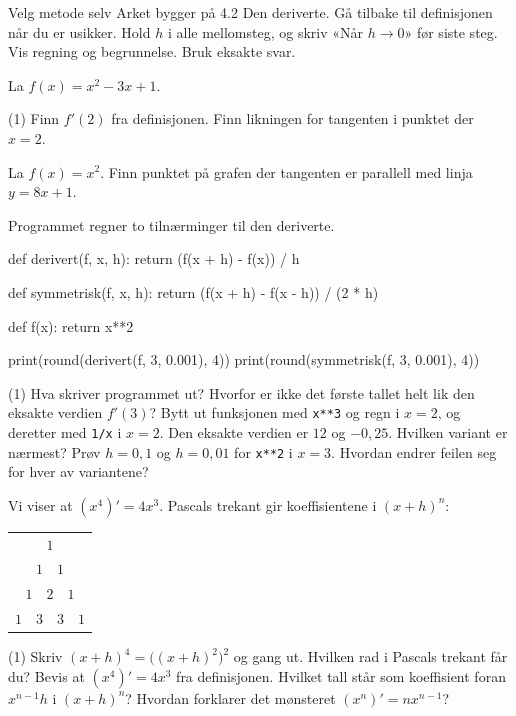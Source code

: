
\begin{infoboks}{Velg metode selv}
Arket bygger på 4.2 Den deriverte. Gå tilbake til definisjonen når du er usikker.
Hold $h$ i alle mellomsteg, og skriv «Når $h \to 0$» før siste steg.
Vis regning og begrunnelse. Bruk eksakte svar.
\end{infoboks}


La $f(x) = x^2 - 3x + 1$.
\begin{tasks}(1)
  \task Finn $f'(2)$ fra definisjonen.
  \task Finn likningen for tangenten i punktet der $x = 2$.
\end{tasks}

La $f(x) = x^2$. Finn punktet på grafen der tangenten er parallell med linja $y = 8x + 1$.

Programmet regner to tilnærminger til den deriverte.
\begin{kode}
def derivert(f, x, h):
    return (f(x + h) - f(x)) / h

def symmetrisk(f, x, h):
    return (f(x + h) - f(x - h)) / (2 * h)

def f(x):
    return x**2

print(round(derivert(f, 3, 0.001), 4))
print(round(symmetrisk(f, 3, 0.001), 4))
\end{kode}
\begin{tasks}(1)
  \task Hva skriver programmet ut? Hvorfor er ikke det første tallet helt lik den eksakte verdien $f'(3)$?
  \task Bytt ut funksjonen med \lstinline[style=laereverk,numbers=none,frame=none]|x**3| og regn i $x = 2$, og deretter med \lstinline[style=laereverk,numbers=none,frame=none]|1/x| i $x = 2$. Den eksakte verdien er $12$ og $-0{,}25$. Hvilken variant er nærmest?
  \task Prøv $h = 0{,}1$ og $h = 0{,}01$ for \lstinline[style=laereverk,numbers=none,frame=none]|x**2| i $x = 3$. Hvordan endrer feilen seg for hver av variantene?
\end{tasks}


Vi viser at $(x^4)' = 4x^3$. Pascals trekant gir koeffisientene i $(x + h)^n$:
\begin{center}
\begin{tabular}{c}
$1$\\
$1 \quad 1$\\
$1 \quad 2 \quad 1$\\
$1 \quad 3 \quad 3 \quad 1$\\
\end{tabular}
\end{center}
\begin{tasks}(1)
  \task Skriv $(x + h)^4 = \big((x + h)^2\big)^2$ og gang ut. Hvilken rad i Pascals trekant får du?
  \task Bevis at $(x^4)' = 4x^3$ fra definisjonen.
  \task Hvilket tall står som koeffisient foran $x^{n-1}h$ i $(x + h)^n$? Hvordan forklarer det mønsteret $(x^n)' = nx^{n-1}$?
\end{tasks}


